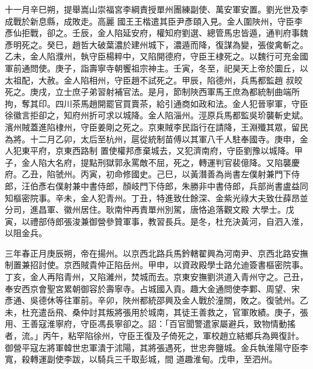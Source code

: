 \begin{pinyinscope}
 十一月辛巳朔，提舉嵩山崇福宮李綱責授單州團練副使、萬安軍安置。劉光世及李成戰於新息縣，成敗走。高麗
 國王王楷遣其臣尹彥頤入見。金人圍陜州，守臣李彥仙拒戰，卻之。壬辰，金人陷延安府，權知府劉選、總管馬忠皆遁，通判府事魏彥明死之。癸巳，趙哲大破葉濃於建州城下，濃遁而降，復謀為變，張俊禽斬之。乙未，金人陷濮州，執守臣楊粹中，又陷開德府，守臣王棣死之。以魏行可充金國軍前通問使。庚子，詣壽寧寺朝饗祖宗神主。壬寅，冬至，祀昊天上帝於圜丘，以太祖配，大赦。金人陷相州，守臣趙不試死之。甲辰，陷德州，兵馬都監趙
 叔皎死之。庚戌，立士庶子弟習射補官法。是月，節制陜西軍馬王庶為都統制曲端所拘，奪其印。四川茶馬趙開罷官買賣茶，給引通商如政和法。金人犯晉寧軍，守臣徐徽言拒卻之，知府州折可求以城降。金人陷淄州。涇原兵馬都監吳玠襲斬史斌。濱州賊蓋進陷棣州，守臣姜剛之死之。京東賊李民詣行在請降，王淵殲其眾，留民為將。十二月乙卯，太后至杭州，扈從統制苗傅以其軍八千人駐奉國寺。庚申，金人犯東平府，京東西路制
 置使權邦彥棄城去，又犯濟南府，守臣劉豫以城降。甲子，金人陷大名府，提點刑獄郭永罵敵不屈，死之，轉運判官裴億降。又陷襲慶府。乙丑，陷虢州。丙寅，初命修國史。己巳，以黃潛善為尚書左僕射兼門下侍郎，汪伯彥右僕射兼中書侍郎，顏岐門下侍郎，朱勝非中書侍郎，兵部尚書盧益同知樞密院事。辛未，金人犯青州。丁丑，特進致仕餘深、金紫光祿大夫致仕薛昂並分司，進昌軍、徽州居住。耿南仲再責單州別駕，唐恪追落觀文殿
 大學士。戊寅，以禮部侍郎張浚兼御營參贊軍事，教習長兵。是冬，杜充決黃河，自泗入淮，以阻金兵。



 三年春正月庚辰朔，帝在揚州。以京西北路兵馬鈐轄翟興為河南尹、京西北路安撫制置兼招討使。京西賊貴仲正陷岳州。甲申，以資政殿學士路允迪簽書樞密院事。丁亥，金人再陷青州，又陷濰州，焚城而去。京東安撫劉洪道入青州守之。己丑，奉安西京會聖宮累朝御容於壽寧寺。占城國入貢。趣大金通問使李鄴、周望、宋
 彥通、吳德休等往軍前。辛卯，陜州都統邵興及金人戰於潼關，敗之。復虢州。乙未，杜充遣岳飛、桑仲討其叛將張用於城南，其徒王善救之，官軍敗績。庚子，張用、王善寇淮寧府，守臣馮長寧卻之。詔：「百官聞警遣家屬避兵，致物情動搖者，流。」丙午，粘罕陷徐州，守臣王復及子倚死之，軍校趙立結鄉兵為興復計。御營平寇左將軍韓世忠軍潰于沭陽，其將張遇死，世忠奔鹽城。金兵執淮陽守臣李寬，殺轉運副使李跋，以騎兵三千取彭城，間
 道趣淮甸。戊申，至泗州。




\end{pinyinscope}
